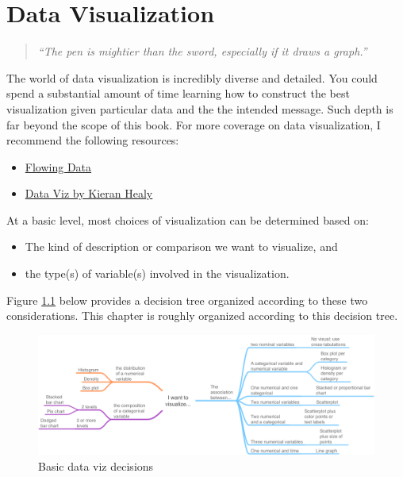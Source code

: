 \documentclass[
]{book}
\providecommand{\tightlist}{%
  \setlength{\itemsep}{0pt}\setlength{\parskip}{0pt}}
\begin{document}
\hypertarget{data-visualization}{%
\chapter{Data Visualization}\label{data-visualization}}

\begin{quote}
\emph{``The pen is mightier than the sword, especially if it draws a graph.''}
\end{quote}

The world of data visualization is incredibly diverse and detailed. You could spend a substantial amount of time learning how to construct the best visualization given particular data and the the intended message. Such depth is far beyond the scope of this book. For more coverage on data visualization, I recommend the following resources:

\begin{itemize}
\tightlist
\item
  \href{https://flowingdata.com}{Flowing Data}
\item
  \href{https://socviz.co/index.html\#preface}{Data Viz by Kieran Healy}
\end{itemize}

At a basic level, most choices of visualization can be determined based on:

\begin{itemize}
\tightlist
\item
  The kind of description or comparison we want to visualize, and
\item
  the type(s) of variable(s) involved in the visualization.
\end{itemize}

Figure \ref{fig:vizflow} below provides a decision tree organized according to these two considerations. This chapter is roughly organized according to this decision tree.

\begin{figure}

{\centering \includegraphics[width=\textwidth]{images/vizflow2} 

}

\caption{Basic data viz decisions}\label{fig:vizflow}
\end{figure}
\end{document}
